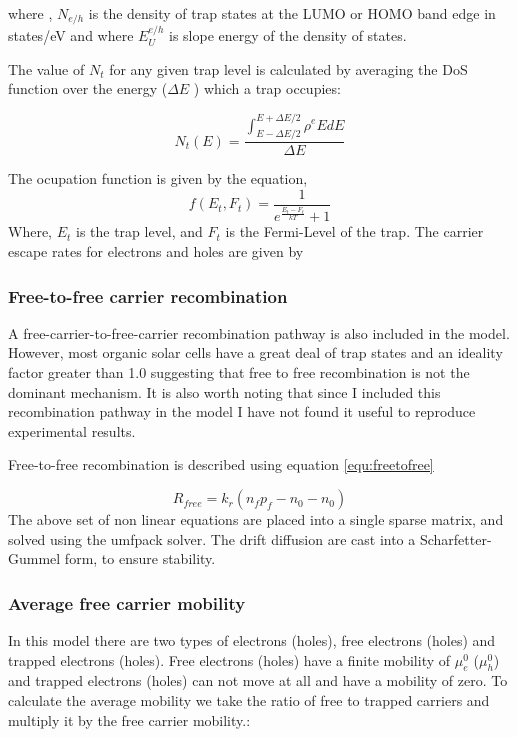 \documentclass[11pt]{article}
\begin{document}
where , $N_{e/h}$ is the density of trap states at the LUMO or HOMO band edge
in states/eV and where $E_{U}^{e/h}$ is slope energy of the density of states. 

The value of $N_{t}$ for any given trap level is calculated by averaging the DoS function over the energy ($\Delta E$ ) which a trap occupies:

\begin{equation}
\label{eq:taile}
N_{t}(E)=\frac{\int^{E+\Delta E/2}_{E-\Delta E/2} \rho^{e}{E} dE}{\Delta E}
\end{equation}

The ocupation function is given by the equation,
\begin{equation}
f(E_{t},F_{t})=\frac{1}{e^{\frac{E_{t}-F_{t}}{kT}}+1}
\end{equation}
Where, $E_{t}$ is the trap level, and $F_{t}$ is the Fermi-Level of the trap.
The carrier escape rates for electrons and holes are given by


\subsubsection{Free-to-free carrier recombination}
A free-carrier-to-free-carrier recombination pathway is also included in the model. However, most organic solar cells have a great deal of trap states and an ideality factor greater than 1.0 suggesting that free to free recombination is not the dominant mechanism.  It is also worth noting that since I included this recombination pathway in the model I have not found it useful to reproduce experimental results.

Free-to-free recombination is described using equation \ref{equ:freetofree}

\begin{equation}
R_{free}=k_{r}(n_{f}p_{f}-n_{0}-n_{0})
\label{equ:freetofree}
\end{equation}
The above set of non linear equations are placed into a single sparse matrix, and solved using the umfpack solver. The drift diffusion are cast into a Scharfetter-Gummel form, to ensure stability.

\subsubsection{Average free carrier mobility}
In this model there are two types of electrons (holes), free electrons (holes) and trapped electrons (holes).  Free electrons (holes) have a finite mobility of $\mu_e^0$ ($\mu_h^0$) and trapped electrons (holes) can not move at all and have a mobility of zero.  To calculate the average mobility we take the ratio of free to trapped carriers and multiply it by the free carrier mobility.:
\end{document}
